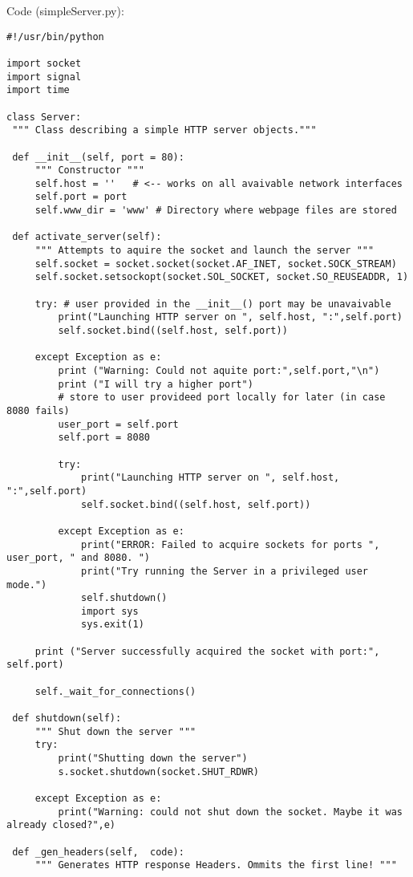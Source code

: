 \documentclass{WeSTassignment}
\begin{document}
Code (simpleServer.py): \\ 
\begin{lstlisting}
#!/usr/bin/python

import socket
import signal
import time

class Server:
 """ Class describing a simple HTTP server objects."""

 def __init__(self, port = 80):
     """ Constructor """
     self.host = ''   # <-- works on all avaivable network interfaces
     self.port = port
     self.www_dir = 'www' # Directory where webpage files are stored

 def activate_server(self):
     """ Attempts to aquire the socket and launch the server """
     self.socket = socket.socket(socket.AF_INET, socket.SOCK_STREAM)
     self.socket.setsockopt(socket.SOL_SOCKET, socket.SO_REUSEADDR, 1)

     try: # user provided in the __init__() port may be unavaivable
         print("Launching HTTP server on ", self.host, ":",self.port)
         self.socket.bind((self.host, self.port))

     except Exception as e:
         print ("Warning: Could not aquite port:",self.port,"\n")
         print ("I will try a higher port")
         # store to user provideed port locally for later (in case 8080 fails)
         user_port = self.port
         self.port = 8080

         try:
             print("Launching HTTP server on ", self.host, ":",self.port)
             self.socket.bind((self.host, self.port))

         except Exception as e:
             print("ERROR: Failed to acquire sockets for ports ", user_port, " and 8080. ")
             print("Try running the Server in a privileged user mode.")
             self.shutdown()
             import sys
             sys.exit(1)

     print ("Server successfully acquired the socket with port:", self.port)

     self._wait_for_connections()

 def shutdown(self):
     """ Shut down the server """
     try:
         print("Shutting down the server")
         s.socket.shutdown(socket.SHUT_RDWR)

     except Exception as e:
         print("Warning: could not shut down the socket. Maybe it was already closed?",e)

 def _gen_headers(self,  code):
     """ Generates HTTP response Headers. Ommits the first line! """


\end{lstlisting}
\end{document}
